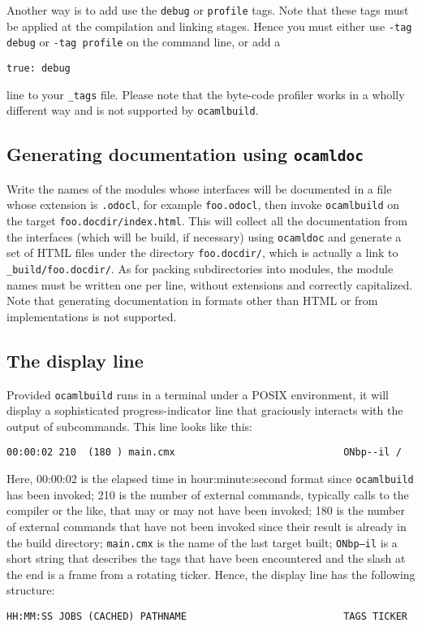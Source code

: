 \documentclass[9pt]{article}
\newcommand{\ocb}{\texttt{ocamlbuild}\xspace}
\newcommand{\tags}{\texttt{\_tags}\xspace}
\begin{document}
Another way is to add use the \texttt{debug} or \texttt{profile} tags.
Note that these tags must be applied at the compilation and linking stages.
Hence you must either use \texttt{-tag debug} or \texttt{-tag profile}
on the command line, or add a
\begin{verbatim}
true: debug
\end{verbatim}
line to your \tags file.
Please note that the byte-code profiler works in a wholly different way
and is not supported by \ocb.
\subsection{Generating documentation using \texttt{ocamldoc}}
Write the names of the modules whose interfaces will be documented in a file
whose extension is \texttt{.odocl}, for example \texttt{foo.odocl}, then invoke
\ocb on the target \texttt{foo.docdir/index.html}.  This will collect all the
documentation from the interfaces (which will be build, if necessary) using
\texttt{ocamldoc} and generate a set of HTML files under the directory
\texttt{foo.docdir/}, which is actually a link to \texttt{\_build/foo.docdir/}.
As for packing subdirectories into modules, the module names must be written
one per line, without extensions and correctly capitalized.  Note that
generating documentation in formats other than HTML or from implementations is
not supported.
\subsection{The display line}
Provided \ocb runs in a terminal under a POSIX environment, it will
display a sophisticated progress-indicator line that graciously interacts
with the output of subcommands.  This line looks like this:
\begin{verbatim}
00:00:02 210  (180 ) main.cmx                             ONbp--il /
\end{verbatim}
Here, 00:00:02 is the elapsed time in hour:minute:second format since \ocb has
been invoked; 210 is the number of external commands, typically calls to the
compiler or the like, that may or may not have been invoked; 180 is the number
of external commands that have not been invoked since their result is already
in the build directory; \texttt{main.cmx} is the name of the last target built;
\texttt{ONbp--il} is a short string that describes the tags that have been
encountered and the slash at the end is a frame from a rotating ticker.  Hence,
the display line has the following structure:
\begin{verbatim}
HH:MM:SS JOBS (CACHED) PATHNAME                           TAGS TICKER
\end{verbatim}
\end{document}
